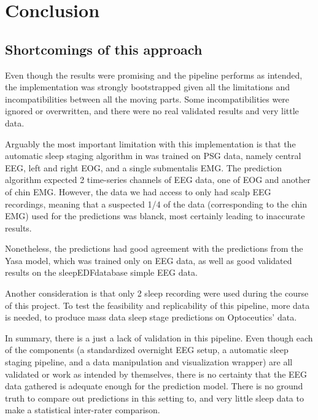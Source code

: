 \section{Conclusion}





\subsection{Shortcomings of this approach} %
Even though the results were promising and the pipeline performs as intended, the implementation was strongly bootstrapped given all the limitations and incompatibilities between all the moving parts. Some incompatibilities were ignored or overwritten, and there were no real validated results and very little data.

Arguably the most important limitation with this implementation is that the automatic sleep staging algorithm in \cite{Alexander2020} was trained on PSG data, namely central EEG, left and right EOG, and a single submentalis EMG. The prediction algorithm expected 2 time-series channels of EEG data, one of EOG and another of chin EMG. However, the data we had access to only had scalp EEG recordings, meaning that a suspected 1/4 of the data (corresponding to the chin EMG) used for the predictions was blanck, most certainly leading to inaccurate results. 

Nonetheless, the predictions had good agreement with the predictions from the Yasa model, which was trained only on EEG data, as well as good validated results on the sleepEDFdatabase simple EEG data.

Another consideration is that only 2 sleep recording were used during the course of this project. To test the feasibility and replicability of this pipeline, more data is needed, to produce mass data sleep stage predictions on Optoceutics' data.

In summary, there is a just a lack of validation in this pipeline. Even though each of the components (a standardized overnight EEG setup, a automatic sleep staging pipeline, and a data manipulation and visualization wrapper) are all validated or work as intended by themselves, there is no certainty that the EEG data gathered is adequate enough for the prediction model. There is no ground truth to compare out predictions in this setting to, and very little sleep data to make a statistical inter-rater comparison.

